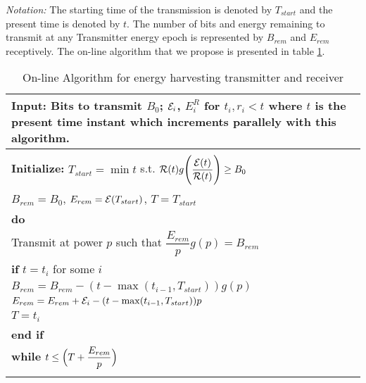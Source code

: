 \textit{Notation:} The starting time of the transmission is denoted by $T_{start}$ and the present time is denoted by $t$. The number of bits and energy remaining to transmit at any Transmitter energy epoch is represented by $B_{rem}$ and $E_{rem}$ receptively.
The on-line algorithm that we propose is presented in table \ref{online}.
\begin{table}
\begin{minipage}[b]{8cm}
\caption {On-line Algorithm for energy harvesting transmitter and receiver}
\begin{tabular}{p{7cm}}
\hline \textbf{Input}: Bits to transmit $B_0$; $\mathcal{E}_i$, $E^R_i$ for $t_i,r_i<t$ where $t$ is the present time instant which increments parallely with this algorithm. 
\\
\hline
\\
\textbf{Initialize:} $T_{start}=\min t$ s.t. $\mathcal{R}(t)g\Bigg{(} \dfrac{\mathcal{E}(t)}{\mathcal{R}(t)}\Bigg{)}\ge B_0$
\\
\hspace{12mm}$B_{rem}=B_0$, $E_{rem}=\mathcal{E}(T_{start})$, $T=T_{start}$
\\
\textbf{do}
\\
\hspace{4mm} Transmit at power $p$ such that $\dfrac{E_{rem}}{p} g(p)= B_{rem}$
\\
\hspace{4mm} \textbf{if} $t=t_i$ for some $i$ 
\\
\hspace{7mm} $B_{rem}=B_{rem}-(t-\max (t_{i-1},T_{start}))g(p)$
\\
\hspace{7mm} $E_{rem}=E_{rem}+\mathcal{E}_i-(t-\max (t_{i-1},T_{start}))p$
\\
\hspace{7mm} $T=t_i$
\\
\hspace{4mm} \textbf{end if}
\\
\textbf{while} $t\le \Big{(}T+\dfrac{E_{rem}}{p}\Big{)}$
\\
\hline
\label{online}
\end{tabular}
\end{minipage}
\end{table}

